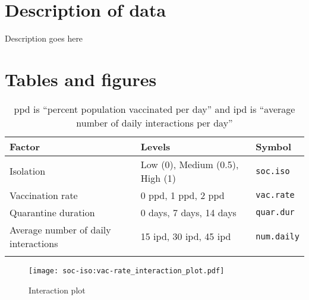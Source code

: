 \documentclass[12pt,a4paper]{article}
\begin{document}
\begin{appendices}
\section{Description of data}\label{appendixB}
Description goes here

\section{Tables and figures}\label{appendixC}

\begin{table}[H]
    \centering
    \begin{tabular}{l l l}\hline
         Factor &  Levels & Symbol \\ \hline\hline
         Isolation & Low (0), Medium (0.5), High (1) & \verb`soc.iso` \\ \hline
         Vaccination rate & 0 \si{ppd}, 1 \si{ppd}, 2 \si{ppd} & \verb`vac.rate` \\ \hline
         Quarantine duration & 0 days, 7 days, 14 days & \verb`quar.dur`\\ \hline
         Average number of daily interactions & 15 \si{ipd}, 30 \si{ipd}, 45 \si{ipd} & \verb`num.daily` \\ \hline \\
    \end{tabular}
    \caption{\si{ppd} is ``percent population vaccinated per day'' and \si{ipd} is ``average number of daily interactions per day''}
    \label{tab:factor_summary}
\end{table}

\begin{figure}[H]
	\texttt{[image: soc-iso:vac-rate\_interaction\_plot.pdf]}
	\caption{Interaction plot}	 %
	\label{fig:soc.iso:vac.rate_interaction}
\end{figure}





\end{appendices}
\end{document}
